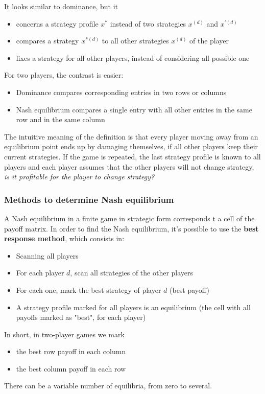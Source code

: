 It looks similar to dominance, but it
\begin{itemize}
	\item concerns a strategy profile $x^\ast$ instead of two strategies $x^{(d)}$ and $x^{'(d)}$
	
	\item compares a strategy $x^{\ast (d)}$ to all other strategies $x^{(d)}$ of the player 
	
	\item fixes a strategy for all other players, instead of considering all possible one 
\end{itemize}

For two players, the contrast is easier: 
\begin{itemize}
	\item Dominance compares corresponding entries in two rows or columns
	
	\item Nash equilibrium compares a single entry with all other entries in the same row and in the same column
\end{itemize}

The intuitive meaning of the definition is that every player moving away from an equilibrium point ends up by damaging themselves, if all other players keep their current strategies. If the game is repeated, the last strategy profile is known to all players and each player assumes that the other players will not change strategy, \textit{is it profitable for the player to change strategy?}

\subsubsection{Methods to determine Nash equilibrium}

A Nash equilibrium in a finite game in strategic form corresponds t a cell of the payoff matrix. In order to find the Nash equilibrium, it's possible to use the \textbf{best response method}, which consists in:
\begin{itemize}
	\item Scanning all players 
	
	\item For each player $d$, scan all strategies of the other players 
	
	\item For each one, mark the best strategy of player $d$ (best payoff)
	
	\item A strategy profile marked for all players is an equilibrium (the cell with all payoffs marked as "best", for each player)
\end{itemize}

In short, in two-player games we mark
\begin{itemize}
	\item the best row payoff in each column
	
	\item the best column payoff in each row
\end{itemize}

There can be a variable number of equilibria, from zero to several.

